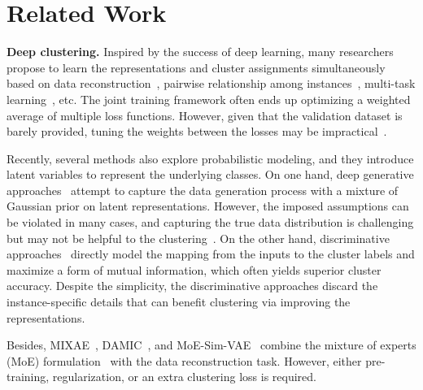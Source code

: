 \documentclass{article} \usepackage{iclr2021_conference,times}
\begin{document}
\section{Related Work}\label{sec:related_work}
{\bf Deep clustering.} 
Inspired by the success of deep learning, many researchers propose to learn the representations and cluster assignments simultaneously~\citep{xie2016unsupervised,yang2016joint,yang2017towards} based on data reconstruction~\citep{xie2016unsupervised,yang2017towards}, pairwise relationship among instances~\citep{chang2017deep,haeusser2018associative,wu2019deep}, multi-task learning~\citep{shiran2019multi,niu2020gatcluster}, etc. The joint training framework often ends up optimizing a weighted average of multiple loss functions.
However, given that the validation dataset is barely provided, tuning the weights between the losses may be impractical~\citep{ghasedi2017deep}. 




Recently, several methods also explore probabilistic modeling, and they introduce latent variables to represent the underlying classes. On one hand, deep generative approaches~\citep{jiang2016variational,dilokthanakul2016deep,chongxuan2018graphical,mukherjee2019clustergan,yang2019deep} attempt to capture the data generation process with a mixture of Gaussian prior on latent representations. However, the imposed assumptions can be violated in many cases, and capturing the true data distribution is challenging but may not be helpful to the clustering~\citep{krause2010discriminative}. On the other hand, discriminative approaches~\citep{hu2017learning,ji2019invariant,darlow2020dhog} directly model the mapping from the inputs to the cluster labels and maximize a form of mutual information, which often yields superior cluster accuracy. Despite the simplicity, the discriminative approaches discard the instance-specific details that can benefit clustering via improving the representations.










Besides, MIXAE~\citep{zhang2017deep}, DAMIC~\citep{chazan2019deep}, and MoE-Sim-VAE~\citep{kopf2019mixture-of-experts} 
combine the mixture of experts (MoE) formulation~\citep{jacobs1991adaptive} with the data reconstruction task. However, either pre-training, regularization, or an extra clustering loss is required.
\end{document}
